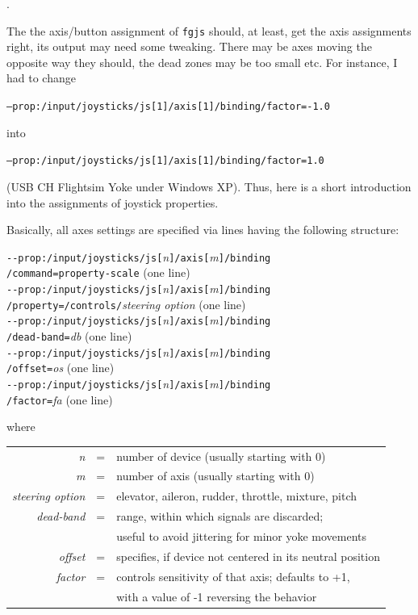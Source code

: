 .

The the axis/button assignment of \texttt{fgjs} should, at least, get the axis assignments right, its output may need some tweaking. There may be axes moving the opposite way they should, the dead zones may be too small etc. For instance, I had to change 

\texttt{--prop:/input/joysticks/js[1]/axis[1]/binding/factor=-1.0}

into

\texttt{--prop:/input/joysticks/js[1]/axis[1]/binding/factor=1.0}

(USB CH Flightsim Yoke under Windows XP). Thus, here is a short introduction into the assignments of joystick properties.

Basically, all axes settings are specified via lines having the following structure:
 \medskip

\noindent
\texttt{-$ $-prop:/input/joysticks/js[}\textit{n}\texttt{]/axis[}\textit{m}\texttt{]/binding}\\
\texttt{/command=property-scale} (one line)\\
\texttt{-$ $-prop:/input/joysticks/js[}\textit{n}\texttt{]/axis[}\textit{m}\texttt{]/binding}\\
\texttt{/property=/controls/}\textit{steering option} (one line)\\
\texttt{-$ $-prop:/input/joysticks/js[}\textit{n}\texttt{]/axis[}\textit{m}\texttt{]/binding}\\
\texttt{/dead-band=}\textit{db} (one line)\\
\texttt{-$ $-prop:/input/joysticks/js[}\textit{n}\texttt{]/axis[}\textit{m}\texttt{]/binding}\\
\texttt{/offset=}\textit{os} (one line)\\
\texttt{-$ $-prop:/input/joysticks/js[}\textit{n}\texttt{]/axis[}\textit{m}\texttt{]/binding}\\
\texttt{/factor=}\textit{fa} (one line)\\
\medskip

 \noindent
 where
 \medskip

\begin{tabular}{rcl}
 \textit{n} &=& number of device (usually starting with 0)\\
 \textit{m} &=& number of axis (usually starting with 0)\\
 \textit{steering option} &=& elevator, aileron, rudder, throttle, mixture, pitch\\
 \textit{dead-band} &=& range, within which signals are discarded;\\
                   && useful to avoid jittering for minor yoke movements\\
 \textit{offset} &=& specifies, if device not centered in its neutral position\\
  \textit{factor} &=& controls sensitivity of that axis; defaults to +1,\\ 
                 &&with a value of -1 reversing the behavior
  \end{tabular}
 \medskip

